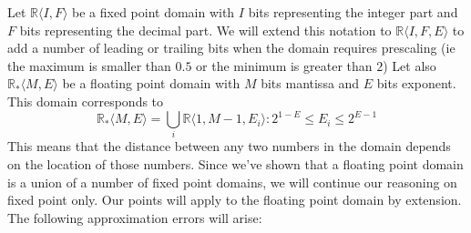 \documentclass[runningheads,a4paper]{llncs}
\begin{document}
Let $\mathbb{R} \langle I,F \rangle$ be a fixed point domain with $I$ bits representing the integer part and $F$ bits
representing the decimal part. We will extend this notation to $\mathbb{R} \langle I,F,E \rangle$ to add a number of
leading or trailing bits when the domain requires prescaling (ie the maximum is smaller than $0.5$ or the minimum
is greater than $2$)
Let also $\mathbb{R}_* \langle M,E \rangle$ be a floating point domain with $M$ bits
mantissa and $E$ bits exponent. This domain corresponds to 
$$\mathbb{R}_* \langle M,E \rangle = \bigcup_i \mathbb{R} \langle 1,M-1,E_i \rangle : 2^{1-E} \leq E_i  \leq 2^{E-1}$$
This means that the distance between any two numbers in the domain depends on the
location of those numbers.
Since we've shown that a floating point domain is a union of a number of fixed point domains, we will continue our
reasoning on fixed point only. Our points will apply to the floating point domain by extension.
The following approximation errors will arise:
\end{document}
